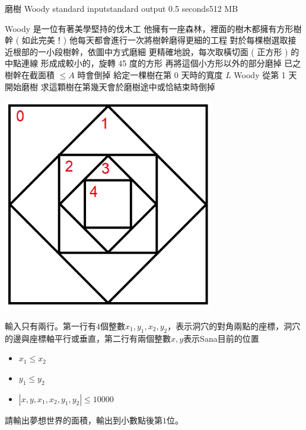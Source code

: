 \gdef\thisproblemauthor{}
\gdef\thisproblemdeveloper{}
\gdef\thisproblemorigin{}
\begin{problem}{磨樹 Woody}
{standard input}{standard output}
{0.5 seconds}{512 MB}{}

Woody 是一位有著美學堅持的伐木工 \newline
他擁有一座森林，裡面的樹木都擁有方形樹幹 ( 如此完美！) \newline
他每天都會進行一次將樹幹磨得更細的工程 \newline
對於每棵樹選取接近根部的一小段樹幹，依圖中方式磨細 \newline
\newline
更精確地說，每次取橫切面 ( 正方形 ) 的中點連線 \newline
形成成較小的，旋轉 45 度的方形 \newline
再將這個小方形以外的部分磨掉 \newline
\newline
已之樹幹在截面積 $ \leq A $ 時會倒掉 \newline
給定一棵樹在第 0 天時的寬度 $ L $ \newline
Woody 從第 1 天開始磨樹 \newline
求這顆樹在第幾天會於磨樹途中或恰結束時倒掉 \newline

\centerline{\includegraphics[scale=0.6]{./pics/A.png}}


\InputFile

輸入只有兩行。第一行有$4$個整數$x_1,y_1,x_2,y_2$，表示洞穴的對角兩點的座標，洞穴的邊與座標軸平行或垂直，第二行有兩個整數$x,y$表示Sana目前的位置

\begin{iofmt}
\begin{itemize}
	\item $x_1\leq x_2$
	\item $y_1\leq y_2$
	\item $|x,y,x_1,x_2,y_1,y_2|\leq 10000$
\end{itemize}
\end{iofmt}

\OutputFile

請輸出夢想世界的面積，輸出到小數點後第$1$位。

\Examples

\begin{example}
%
\end{example}

\end{problem}
